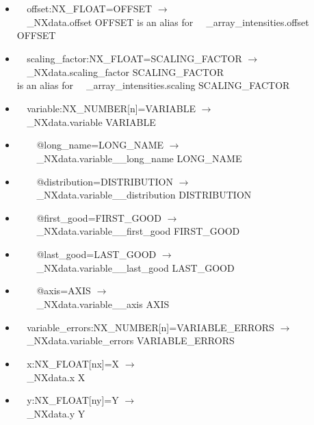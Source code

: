\documentclass[11pt]{article}
\begin{document}
{{\begin{itemize}
\item{\verb|  |offset:NX\_FLOAT=OFFSET $\rightarrow$\\
\verb|  |\_NXdata.offset OFFSET
is an alias for
\verb|  |\_array\_intensities.offset OFFSET
}

\item{\verb|  |scaling\_factor:NX\_FLOAT=SCALING\_FACTOR $\rightarrow$\\
\verb|  |\_NXdata.scaling\_factor SCALING\_FACTOR \\
is an alias for
\verb|  |\_array\_intensities.scaling SCALING\_FACTOR
}

\item{\verb|  |variable:NX\_NUMBER[n]=VARIABLE $\rightarrow$\\
\verb|  |\_NXdata.variable VARIABLE}

\item{\verb|    |@long\_name=LONG\_NAME $\rightarrow$\\
\verb|    |\_NXdata.variable\_\_long\_name LONG\_NAME}

\item{\verb|    |@distribution=DISTRIBUTION $\rightarrow$\\
\verb|    |\_NXdata.variable\_\_distribution DISTRIBUTION}

\item{\verb|    |@first\_good=FIRST\_GOOD $\rightarrow$\\
\verb|    |\_NXdata.variable\_\_first\_good FIRST\_GOOD}

\item{\verb|    |@last\_good=LAST\_GOOD $\rightarrow$\\
\verb|    |\_NXdata.variable\_\_last\_good LAST\_GOOD}

\item{\verb|    |@axis=AXIS $\rightarrow$\\
\verb|    |\_NXdata.variable\_\_axis AXIS}

\item{\verb|  |variable\_errors:NX\_NUMBER[n]=VARIABLE\_ERRORS $\rightarrow$\\
\verb|  |\_NXdata.variable\_errors VARIABLE\_ERRORS}

\item{\verb|  |x:NX\_FLOAT[nx]=X $\rightarrow$\\
\verb|  |\_NXdata.x X}

\item{\verb|  |y:NX\_FLOAT[ny]=Y $\rightarrow$\\
\verb|  |\_NXdata.y Y}


\end{itemize}}}
\end{document}
